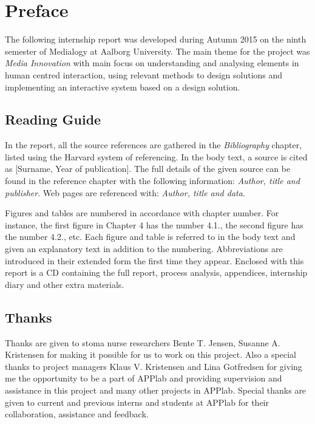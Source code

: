 \chapter{Preface}

The following internship report was developed during Autumn 2015 on the ninth semester of Medialogy at Aalborg University. The main theme for the project was \textit{Media Innovation} with main focus on understanding and analysing elements in human centred interaction, using relevant methods to design solutions and implementing an interactive system based on a design solution. 

\section*{Reading Guide}
In the report, all the source references are gathered in the \textit{Bibliography} chapter, listed using the Harvard system of referencing. In the body text, a source is cited as [Surname, Year of publication]. The full details of the given source can be found in the reference chapter with the following information: \textit{Author, title and publisher}. Web pages are referenced with: \textit{Author, title and data}.

Figures and tables are numbered in accordance with chapter number. For instance, the first figure in Chapter 4 has the number 4.1., the second figure has the number 4.2., etc. Each figure and table is referred to in the body text and given an explanatory text in addition to the numbering. Abbreviations are introduced in their extended form the first time they appear. Enclosed with this report is a CD containing the full report, process analysis, appendices, internship diary and other extra materials. 

\section*{Thanks}
Thanks are given to stoma nurse researchers Bente T. Jensen, Susanne A. Kristensen for making it possible for us to work on this project. Also a special thanks to project managers Klaus V. Kristensen and Lina Gotfredsen for giving me the opportunity to be a part of APPlab and providing supervision and assistance in this project and many other projects in APPlab. Special thanks are given to current and previous interns and students at APPlab for their collaboration, assistance and feedback. 
